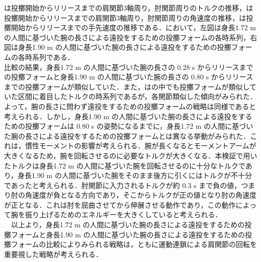 は投擲開始からリリースまでの肩関節3軸周り，肘関節周りのトルクの推移，は投擲開始からリリースまでの肩関節3軸周り，肘関節周りの角速度の推移，は投擲開始からリリースまでの手先速度の推移である．において，左図は身長1.72 m の人間に基づいた腕の長さによる遠投をするための投擲フォームの各時系列，右図は身長1.90 m の人間に基づいた腕の長さによる遠投をするための投擲フォームの各時系列である．\\
比較の結果，身長1.72 m の人間に基づいた腕の長さの 0.28 s からリリースまでの投擲フォームと身長1.90 m の人間に基づいた腕の長さの 0.80 s からリリースまでの投擲フォームが類似していた．また，はの中でも投擲フォームが類似していた区間に着目したトルクの時系列であるが，各関節類似した傾向がみられた．よって，腕の長さに問わず遠投をするための投擲フォームの戦略は同様であると考えられる．しかし，身長1.90 m の人間に基づいた腕の長さによる遠投をするための投擲フォームは 0.80 s の姿勢になるまでに，身長1.72 m の人間に基づいた腕の長さによる遠投をするための投擲フォームとは異なる挙動がみられた．これは，慣性モーメントの影響が考えられる．腕が長くなるとモーメントアームが大きくなるため，腕を回転させるのに必要なトルクが大きくなる．本検証で用いたトルクは身長1.72 m の人間に基づいた腕を回転させるのに十分なトルクであり，身長1.90 m の人間に基づいた腕をそのまま後方に引くにはトルクが不十分であったと考えられる．肘関節に入力されるトルクが約 0.3 s まで負の値，つまり肘の角速度が負となる方向であり，そこからトルクが正の値となり肘の角速度が正となる．これは肘を屈曲させてから伸展させる動作であり，この動作によって腕を振り上げるためのエネルギーを大きくしていると考えられる．\\
　以上より，身長1.72 m の人間に基づいた腕の長さによる遠投をするための投擲フォームと身長1.90 m の人間に基づいた腕の長さによる遠投をするための投擲フォームの比較によりみられる戦略は，ともに運動連鎖による肩関節の回転を重要視した戦略が考えられる．

\clearpage
{}

